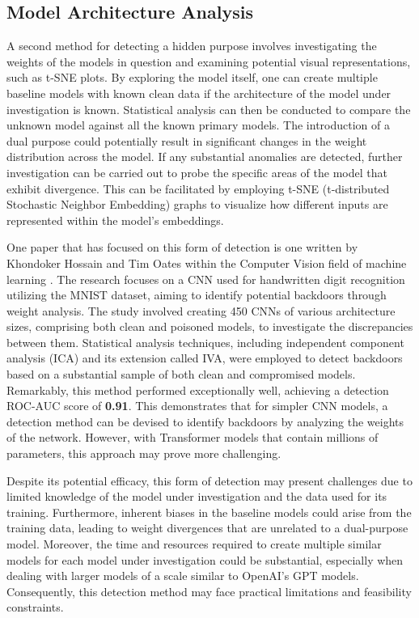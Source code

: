 \subsection{Model Architecture Analysis}

A second method for detecting a hidden purpose involves investigating the weights of the models in question and examining potential visual representations, such as t-SNE plots. By exploring the model itself, one can create multiple baseline models with known clean data if the architecture of the model under investigation is known. Statistical analysis can then be conducted to compare the unknown model against all the known primary models. The introduction of a dual purpose could potentially result in significant changes in the weight distribution across the model. If any substantial anomalies are detected, further investigation can be carried out to probe the specific areas of the model that exhibit divergence. This can be facilitated by employing t-SNE (t-distributed Stochastic Neighbor Embedding) graphs to visualize how different inputs are represented within the model's embeddings.

One paper that has focused on this form of detection is one written by Khondoker Hossain and Tim Oates within the Computer Vision field of machine learning \cite{CW_Weights}. The research focuses on a CNN used for handwritten digit recognition utilizing the MNIST dataset, aiming to identify potential backdoors through weight analysis. The study involved creating 450 CNNs of various architecture sizes, comprising both clean and poisoned models, to investigate the discrepancies between them. Statistical analysis techniques, including independent component analysis (ICA) and its extension called IVA, were employed to detect backdoors based on a substantial sample of both clean and compromised models. Remarkably, this method performed exceptionally well, achieving a detection ROC-AUC score of \textbf{0.91}. This demonstrates that for simpler CNN models, a detection method can be devised to identify backdoors by analyzing the weights of the network. However, with Transformer models that contain millions of parameters, this approach may prove more challenging.

Despite its potential efficacy, this form of detection may present challenges due to limited knowledge of the model under investigation and the data used for its training. Furthermore, inherent biases in the baseline models could arise from the training data, leading to weight divergences that are unrelated to a dual-purpose model. Moreover, the time and resources required to create multiple similar models for each model under investigation could be substantial, especially when dealing with larger models of a scale similar to OpenAI's GPT models. Consequently, this detection method may face practical limitations and feasibility constraints.

